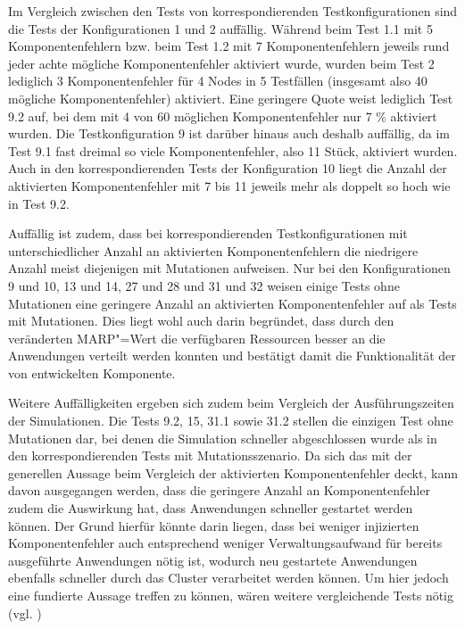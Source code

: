 Im Vergleich zwischen den Tests von korrespondierenden Testkonfigurationen sind die Tests der Konfigurationen 1 und 2 auffällig.
Während beim Test 1.1 mit 5 Komponentenfehlern bzw. beim Test 1.2 mit 7 Komponentenfehlern jeweils rund jeder achte mögliche Komponentenfehler aktiviert wurde, wurden beim Test 2 lediglich 3 Komponentenfehler für 4 Nodes in 5 Testfällen (insgesamt also 40 mögliche Komponentenfehler) aktiviert.
Eine geringere Quote weist lediglich Test 9.2 auf, bei dem mit 4 von 60 möglichen Komponentenfehler nur 7 \% aktiviert wurden.
Die Testkonfiguration 9 ist darüber hinaus auch deshalb auffällig, da im Test 9.1 fast dreimal so viele Komponentenfehler, also 11 Stück, aktiviert wurden.
Auch in den korrespondierenden Tests der Konfiguration 10 liegt die Anzahl der aktivierten Komponentenfehler mit 7 bis 11 jeweils mehr als doppelt so hoch wie in Test 9.2.

Auffällig ist zudem, dass bei korrespondierenden Testkonfigurationen mit unterschiedlicher Anzahl an aktivierten Komponentenfehlern die niedrigere Anzahl meist diejenigen mit Mutationen aufweisen.
Nur bei den Konfigurationen 9 und 10, 13 und 14, 27 und 28 und 31 und 32 weisen einige Tests ohne Mutationen eine geringere Anzahl an aktivierten Komponentenfehler auf als Tests mit Mutationen.
Dies liegt wohl auch darin begründet, dass durch den veränderten \ac{MARP}"=Wert die verfügbaren Ressourcen besser an die Anwendungen verteilt werden konnten und bestätigt damit die Funktionalität der von \citeauthor{zhang2016} entwickelten Komponente.

Weitere Auffälligkeiten ergeben sich zudem beim Vergleich der Ausführungszeiten der Simulationen.
Die Tests 9.2, 15, 31.1 sowie 31.2 stellen die einzigen Test ohne Mutationen dar, bei denen die Simulation schneller abgeschlossen wurde als in den korrespondierenden Tests mit Mutationsszenario.
Da sich das mit der generellen Aussage beim Vergleich der aktivierten Komponentenfehler deckt, kann davon ausgegangen werden, dass die geringere Anzahl an Komponentenfehler zudem die Auswirkung hat, dass Anwendungen schneller gestartet werden können.
Der Grund hierfür könnte darin liegen, dass bei weniger injizierten Komponentenfehler auch entsprechend weniger Verwaltungsaufwand für bereits ausgeführte Anwendungen nötig ist, wodurch neu gestartete Anwendungen ebenfalls schneller durch das Cluster verarbeitet werden können.
Um hier jedoch eine fundierte Aussage treffen zu können, wären weitere vergleichende Tests nötig (vgl. )

